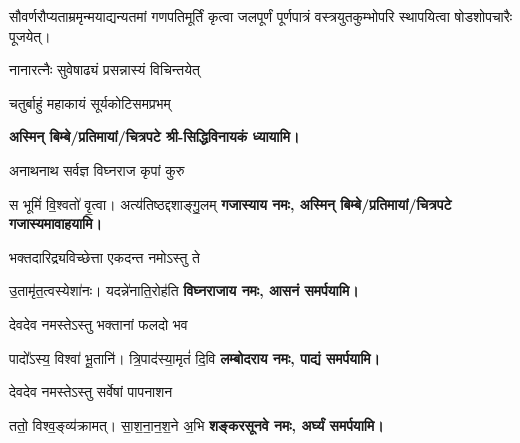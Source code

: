 












सौवर्णरौप्यताम्रमृन्मयाद्यन्यतमां गणपतिमूर्तिं कृत्वा जलपूर्णं पूर्णपात्रं वस्त्रयुतकुम्भोपरि स्थापयित्वा
षोडशोपचारैः पूजयेत्।

\renewcommand{\devAya}{श्री-सिद्धिविनायकाय}
\begin{center}

{नानारत्नैः सुवेषाढ्यं प्रसन्नास्यं विचिन्तयेत्}

{चतुर्बाहुं महाकायं सूर्यकोटिसमप्रभम्}

\textbf{अस्मिन् बिम्बे/प्रतिमायां/चित्रपटे श्री-सिद्धिविनायकं ध्यायामि।}

{अनाथनाथ सर्वज्ञ विघ्नराज कृपां कुरु}

{स भूमिं॑ वि॒श्वतो॑ वृ॒त्वा। अत्य॑तिष्ठद्दशाङ्गु॒लम्}
\textbf{गजास्याय नमः, अस्मिन् बिम्बे/प्रतिमायां/चित्रपटे गजास्यमावाहयामि।}
\medskip

{भक्तदारिद्र्यविच्छेत्ता एकदन्त नमोऽस्तु ते}

{उ॒तामृ॑त॒त्वस्येशा॑नः। यदन्ने॑नाति॒रोह॑ति}
\textbf{विघ्नराजाय नमः, आसनं समर्पयामि।}
\medskip

{देवदेव नमस्तेऽस्तु भक्तानां फलदो भव}

{पादो᳚ऽस्य॒ विश्वा॑ भू॒तानि॑। त्रि॒पाद॑स्या॒मृतं॑ दि॒वि}
\textbf{लम्बोदराय नमः, पाद्यं समर्पयामि।}
\medskip

{देवदेव नमस्तेऽस्तु सर्वेषां पापनाशन}

{ततो॒ विश्व॒ङ्व्य॑क्रामत्। सा॒श॒ना॒न॒श॒ने अ॒भि}
\textbf{शङ्करसूनवे नमः, अर्घ्यं समर्पयामि।}
\medskip


\end{center}

